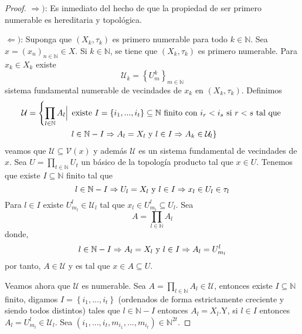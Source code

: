\documentclass[12pt]{report}
\theoremstyle{largebreak}
\begin{document}
    \begin{proof}
        $\Rightarrow)$: Es inmediato del hecho de que la propiedad de ser primero numerable es hereditaria y topológica.

        $\Leftarrow)$: Suponga que $(X_k,\tau_k)$ es primero numerable para todo $k\in\mathbb{N}$. Sea $x=(x_n)_{n\in\mathbb{N}}\in X$. Si $k\in\mathbb{N}$, se tiene que $(X_k,\tau_k)$ es primero numerable. Para $x_k\in X_k$ existe
        \begin{equation*}
            \mathcal{U}_k=\left\{U_m^k \right\}_{ m\in\mathbb{N}}
        \end{equation*}
        sistema fundamental numerable de vecindades de $x_k$ en $(X_k,\tau_k)$. Definimos
        \begin{equation*}
            \begin{split}
                \mathcal{U}=\left\{\prod_{ l\in\mathbb{N}}A_l\Big|\right.&\textup{ existe }I=\left\{i_1,...,i_t \right\} \subseteq\mathbb{N}\textup{ finito con }i_r<i_s\textup{ si }r<s\textup{ tal que } \\
                &\left.l\in\mathbb{N}-I\Rightarrow A_l=X_l\textup{ y }l\in I\Rightarrow A_k\in\mathcal{U}_l \right\}\\
            \end{split}
        \end{equation*}
        veamos que $\mathcal{U}\subseteq\mathcal{V}(x)$ y además $\mathcal{U}$  es un sistema fundamental de vecindades de $x$. Sea $U=\prod_{t\in\mathbb{N}}U_t$ un básico de la topología producto tal que $x\in U$. Tenemos que existe $I\subseteq\mathbb{N}$ finito tal que
        \begin{equation*}
            l\in\mathbb{N}-I\Rightarrow U_l=X_l\textup{ y }l\in I\Rightarrow x_l\in U_l\in\tau_l
        \end{equation*}
        Para $l\in I$ existe $U_{ m_l}^l\in\mathcal{U}_l$ tal que $x_l\in U_{ m_l}^l\subseteq U_l$. Sea
        \begin{equation*}
            A=\prod_{ l\in\mathbb{N}}A_l
        \end{equation*}
        donde,
        \begin{equation*}
            l\in\mathbb{N}-I\Rightarrow A_l=X_l\textup{ y }l\in I\Rightarrow A_l=U_{ m_l}^l
        \end{equation*}
        por tanto, $A\in\mathcal{U}$ y es tal que $x\in A\subseteq U$. 
        
        Veamos ahora que $\mathcal{U}$ es numerable. Sea $A=\prod_{ l\in\mathbb{N}}A_l\in\mathcal{U}$, entonces existe $I\subseteq\mathbb{N}$ finito, digamos $I=\left\{i_1,...,i_t \right\}$ (ordenados de forma estrictamente creciente y siendo todos distintos) tales que $l\in\mathbb{N}-I$ entonces $A_l=X_l$.Y, si $l\in I$ entonces $A_l=U_{ m_l}^l\in\mathcal{U}_l$. Sea $(i_1,...,i_t,m_{i_1},...,m_{i_t})\in\mathbb{N}^{ 2t}$. 
        

\end{proof}
\end{document}
